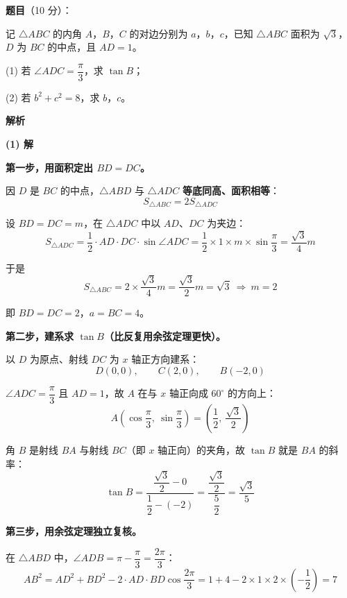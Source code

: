 \begin{answer}

\textbf{题目}（10 分）：

记 $\triangle ABC$ 的内角 $A$，$B$，$C$ 的对边分别为 $a$，$b$，$c$，已知 $\triangle ABC$ 面积为 $\sqrt3$，$D$ 为 $BC$ 的中点，且 $AD=1$。

  (1) 若 $\angle ADC=\dfrac\pi3$，求 $\tan B$；

  (2) 若 $b^{2}+c^{2}=8$，求 $b$，$c$。

\textbf{解析}

\par\medskip

\textbf{(1) 解}

\textbf{第一步，用面积定出 $BD=DC$。}

因 $D$ 是 $BC$ 的中点，$\triangle ABD$ 与 $\triangle ADC$ \textbf{等底同高、面积相等}：
\nopagebreak[4]
\[S_{\triangle ABC}=2S_{\triangle ADC}\]

设 $BD=DC=m$，在 $\triangle ADC$ 中以 $AD$、$DC$ 为夹边：
\nopagebreak[4]
\[S_{\triangle ADC}=\frac12\cdot AD\cdot DC\cdot\sin\angle ADC=\frac12\times1\times m\times\sin\frac\pi3=\frac{\sqrt3}4m\]

于是
\nopagebreak[4]
\[S_{\triangle ABC}=2\times\frac{\sqrt3}4m=\frac{\sqrt3}2m=\sqrt3\ \Longrightarrow\ m=2\]

即 $BD=DC=2$，$a=BC=4$。

\textbf{第二步，建系求 $\tan B$（比反复用余弦定理更快）。}

以 $D$ 为原点、射线 $DC$ 为 $x$ 轴正方向建系：
\nopagebreak[4]
\[D(0,0),\qquad C(2,0),\qquad B(-2,0)\]

$\angle ADC=\dfrac\pi3$ 且 $AD=1$，故 $A$ 在与 $x$ 轴正向成 $60^\circ$ 的方向上：
\nopagebreak[4]
\[A\left(\cos\frac\pi3,\ \sin\frac\pi3\right)=\left(\frac12,\ \frac{\sqrt3}2\right)\]

角 $B$ 是射线 $BA$ 与射线 $BC$（即 $x$ 轴正向）的夹角，故 $\tan B$ 就是 $BA$ 的斜率：
\nopagebreak[4]
\[\tan B=\frac{\dfrac{\sqrt3}2-0}{\dfrac12-(-2)}=\frac{\dfrac{\sqrt3}2}{\dfrac52}=\frac{\sqrt3}5\]

\textbf{第三步，用余弦定理独立复核。}

在 $\triangle ABD$ 中，$\angle ADB=\pi-\dfrac\pi3=\dfrac{2\pi}3$：
\nopagebreak[4]
\[AB^{2}=AD^{2}+BD^{2}-2\cdot AD\cdot BD\cos\frac{2\pi}3=1+4-2\times1\times2\times\left(-\frac12\right)=7\]


\end{answer}
